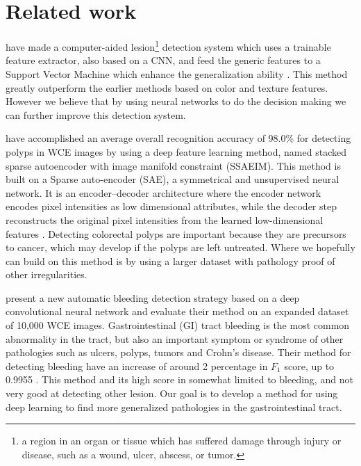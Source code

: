 \documentclass[thesis.tex]{subfiles}
\begin{document}
\section{Related work} \label{relatedwork}
%
\citeauthor*{LesionDetection15} have made a computer-aided lesion\footnote{a region in an organ or tissue which has suffered damage through injury or disease, such as a wound, ulcer, abscess, or tumor.} detection system which uses a trainable feature extractor, also based on a CNN, and feed the generic features to a Support Vector Machine which enhance the generalization ability \cite{LesionDetection15}. This method greatly outperform the earlier methods based on color and texture features. However we believe that by using neural networks to do the decision making we can further improve this detection system. 

\medbreak 
\citeauthor*{DeepLearning17} have accomplished an average overall recognition accuracy of 98.0\% for detecting polyps in WCE images by using a deep feature learning method, named stacked sparse autoencoder with image manifold constraint (SSAEIM). This method is built on a Sparse auto-encoder (SAE), a symmetrical and unsupervised neural network. It is an encoder–decoder architecture where the encoder network encodes pixel intensities as low dimensional attributes, while the decoder step reconstructs the original pixel intensities from the learned low-dimensional features \cite{DeepLearning17}. Detecting colorectal polyps are important because they are precursors to cancer, which may develop if the polyps are left untreated. Where we hopefully can build on this method is by using a larger dataset with pathology proof of other irregularities.

\medbreak
\citeauthor*{DeepConvolutional16} present a new automatic bleeding detection strategy based on a deep convolutional neural network and evaluate their method on an expanded dataset of 10,000 WCE images. Gastrointestinal (GI) tract bleeding is the most common abnormality in the tract, but also an important symptom or syndrome of other pathologies such as ulcers, polyps, tumors and Crohn's disease. Their method for detecting bleeding have an increase of around 2 percentage in $F_1$ score, up to 0.9955 \cite{DeepConvolutional16}. This method and its high score in somewhat limited to bleeding, and not very good at detecting other lesion. 
Our goal is to develop a method for using deep learning to find more generalized pathologies in the gastrointestinal tract.
\end{document}
